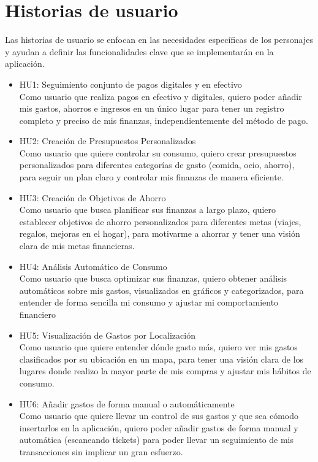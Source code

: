 \section{Historias de usuario}
Las historias de usuario se enfocan en las necesidades específicas de los personajes y ayudan a definir las funcionalidades clave que se implementarán en la aplicación.

\begin{itemize}
    \item HU1: Seguimiento conjunto de pagos digitales y en efectivo\\
    Como usuario que realiza pagos en efectivo y digitales,
    quiero poder añadir mis gastos, ahorros e ingresos en un único lugar
    para tener un registro completo y preciso de mis finanzas, independientemente del método de pago.
    \item HU2: Creación de Presupuestos Personalizados\\
    Como usuario que quiere controlar su consumo,
    quiero crear presupuestos personalizados para diferentes categorías de gasto (comida, ocio, ahorro),
    para seguir un plan claro y controlar mis finanzas de manera eficiente.
    \item HU3: Creación de Objetivos de Ahorro\\
    Como usuario que busca planificar sus finanzas a largo plazo,
    quiero establecer objetivos de ahorro personalizados para diferentes metas (viajes, regalos, mejoras en el hogar),
    para motivarme a ahorrar y tener una visión clara de mis metas financieras.
    \item HU4: Análisis Automático de Consumo\\
    Como usuario que busca optimizar sus finanzas,
    quiero obtener análisis automáticos sobre mis gastos, visualizados en gráficos y categorizados,
    para entender de forma sencilla mi consumo y ajustar mi comportamiento financiero
    \item HU5: Visualización de Gastos por Localización\\
    Como usuario que quiere entender dónde gasto más,
    quiero ver mis gastos clasificados por su ubicación en un mapa,
    para tener una visión clara de los lugares donde realizo la mayor parte de mis compras y ajustar mis hábitos de consumo.
    \item HU6: Añadir gastos de forma manual o automáticamente\\ 
    Como usuario que quiere llevar un control de sus gastos y que sea cómodo insertarlos en la aplicación, quiero poder añadir gastos de forma manual y automática (escaneando tickets) para poder llevar un seguimiento de mis transacciones sin implicar un gran esfuerzo.


\end{itemize}
